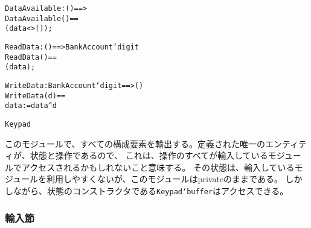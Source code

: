 \documentclass[\pformat,12pt]{jarticle}
\begin{document}
\begin{description}
\begin{alltt}

    DataAvailable : () ==> 
    DataAvailable () ==
      (data <> []);

    ReadData : () ==>  BankAccount`digit
    ReadData () ==
      (data);

    WriteData :  BankAccount`digit ==> ()
    WriteData (d) ==
      data := data^d

 Keypad
\end{alltt}
このモジュールで、すべての構成要素を輸出する。定義された唯一のエンティティが、状態と操作であるので、
これは、操作のすべてが輸入しているモジュールでアクセスされるかもしれないこと意味する。
その状態は、輸入しているモジュールを利用しやすくないが、このモジュールはprivateのままである。
しかしながら、状態のコンストラクタである\texttt{Keypad`buffer}はアクセスできる。

\end{description}

\subsubsection{輸入節}
\end{document}
